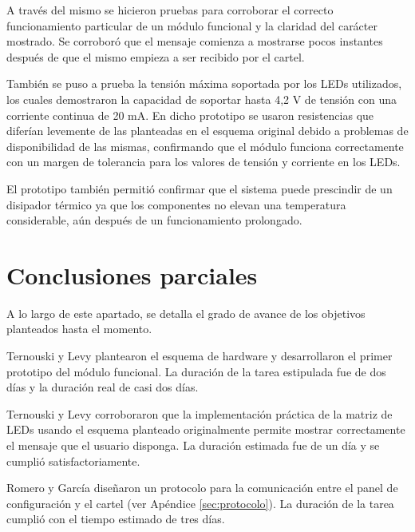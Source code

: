 A través del mismo se hicieron pruebas para corroborar el correcto funcionamiento particular de un módulo funcional y la claridad del carácter mostrado. Se corroboró que el mensaje comienza a mostrarse pocos instantes después de que el mismo empieza a ser recibido por el cartel.

También se puso a prueba la tensión máxima soportada por los LEDs utilizados, los cuales demostraron la capacidad de soportar hasta 4,2 V de tensión con una corriente continua de 20 mA. En dicho prototipo se usaron resistencias que diferían levemente de las planteadas en el esquema original debido a problemas de disponibilidad de las mismas, confirmando que el módulo funciona correctamente con un margen de tolerancia para los valores de tensión y corriente en los LEDs.

El prototipo también permitió confirmar que el sistema puede prescindir de un disipador térmico ya que los componentes no elevan una temperatura considerable, aún después de un funcionamiento prolongado.


\section{Conclusiones parciales}
A lo largo de este apartado, se detalla el grado de avance de los objetivos planteados hasta el momento.

Ternouski y Levy plantearon el esquema de hardware y desarrollaron el primer prototipo del módulo funcional. La duración de la tarea estipulada fue de dos días y la duración real de casi dos días.

Ternouski y Levy corroboraron que la implementación práctica de la matriz de LEDs usando el esquema planteado originalmente permite mostrar correctamente el mensaje que el usuario disponga. La duración estimada fue de un día y se cumplió satisfactoriamente.

Romero y García diseñaron un protocolo para la comunicación entre el panel de configuración y el cartel (ver Apéndice \ref{sec:protocolo}). La duración de la tarea cumplió con el tiempo estimado de tres días.

